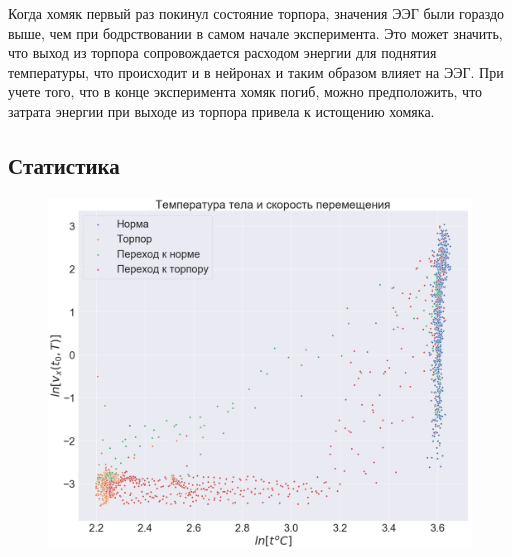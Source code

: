 \documentclass[12pt,a4paper,oneside]{article}
\begin{document}
Когда хомяк первый раз покинул состояние торпора, значения ЭЭГ были гораздо выше, чем при бодрствовании в самом начале эксперимента. Это может значить, что выход из торпора сопровождается расходом энергии для поднятия температуры, что происходит и в нейронах и таким образом влияет на ЭЭГ. При учете того, что в конце эксперимента хомяк погиб, можно предположить, что затрата энергии при выходе из торпора привела к истощению хомяка.

\subsection{Статистика}

\begin{figure}[H]
\centering
\begin{minipage}{.5\textwidth}
  \centering
  \includegraphics[width=\textwidth]{t_vs_speed.png}
  \label{fig:t_vs_speed}
\end{minipage}%
\begin{minipage}{.5\textwidth}
  \centering

\end{minipage}
\end{figure}
\end{document}
